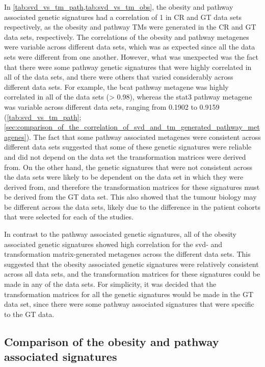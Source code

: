 In \cref{tab:svd_vs_tm_path,tab:svd_vs_tm_obs}, the obesity and pathway associated genetic signatures had a correlation of 1 in CR and GT data sets respectively, as the obesity and pathway TMs were generated in the CR and GT data sets, respectively.
The correlations of the obesity and pathway metagenes were variable across different data sets, which was as expected since all the data sets were different from one another.
However, what was unexpected was the fact that there were some pathway genetic signatures that were highly correlated in all of the data sets, and there were others that varied considerably across different data sets.
For example, the \gls{bcat} pathway metagene was highly correlated in all of the data sets (\textgreater{} 0.98), whereas the \gls{stat3} pathway metagene was variable across different data sets, ranging from 0.1902 to 0.9159 (\cref{tab:svd_vs_tm_path}; \cref{sec:comparison_of_the_correlation_of_svd_and_tm_generated_pathway_metagenes}).
The fact that some pathway associated metagenes were consistent across different data sets suggested that some of these genetic signatures were reliable and did not depend on the data set the transformation matrices were derived from.
On the other hand, the genetic signatures that were not consistent across the data sets were likely to be dependent on the data set in which they were derived from, and therefore the transformation matrices for these signatures must be derived from the GT data set.
This also showed that the tumour biology may be different across the data sets, likely due to the difference in the patient cohorts that were selected for each of the studies.

In contrast to the pathway associated genetic signatures, all of the obesity associated genetic signatures showed high correlation for the \gls{svd}- and transformation matrix-generated metagenes across the different data sets.
This suggested that the obesity associated genetic signatures were relatively consistent across all data sets, and the transformation matrices for these signatures could be made in any of the data sets.
For simplicity, it was decided that the transformation matrices for all the genetic  signatures would be made in the GT data set, since there were some pathway associated signatures that were specific to the GT data.

\subsection{Comparison of the obesity and pathway associated signatures}
\label{sub:comparison_of_the_obesity_and_pathway_associated_signatures}

